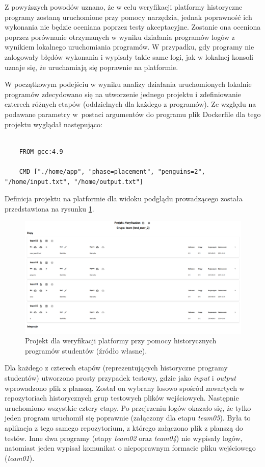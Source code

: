 Z powyższych powodów uznano, że w celu weryfikacji platformy historyczne programy zostaną uruchomione przy pomocy narzędzia, jednak poprawność ich wykonania nie będzie oceniana poprzez testy akceptacyjne.
Zostanie ona oceniona poprzez porównanie otrzymanych w wyniku działania programów logów z wynikiem lokalnego uruchomiania programów.
W przypadku, gdy programy nie zalogowały błędów wykonania i wypisały takie same logi, jak w lokalnej konsoli uznaje się, że uruchamiają się poprawnie na platformie.

W początkowym podejściu w wyniku analizy działania uruchomionych lokalnie programów zdecydowano się na utworzenie jednego projektu i zdefiniowanie czterech różnych etapów (oddzielnych dla każdego z programów).
Ze względu na podawane parametry w~postaci argumentów do programu plik Dockerfile dla tego projektu wyglądał następująco:

{\selectfont
\tiny
\begin{lstlisting}

    FROM gcc:4.9

    CMD ["./home/app", "phase=placement", "penguins=2", "/home/input.txt", "/home/output.txt"]

\end{lstlisting}
}

Definicja projektu na platformie dla widoku podglądu prowadzącego została przedstawiona na rysunku \ref{fig:veryfication_first_project}.

\begin{figure}[h]
    \centering
    \includegraphics[width = 12cm]{chapter06/veryfication_first_project.png}
    \caption{Projekt dla weryfikacji platformy przy pomocy historycznych programów studentów (źródło własne).}
    \label{fig:veryfication_first_project}
\end{figure}

Dla każdego z czterech etapów (reprezentujących historyczne programy studentów) utworzono prosty przypadek testowy, gdzie jako \textit{input} i \textit{output} wprowadzono plik z planszą.
Został on wybrany losowo spośród zawartych w repozytoriach historycznych grup testowych plików wejściowych.
Następnie uruchomiono wszystkie cztery etapy.
Po przejrzeniu logów okazało się, że tylko jeden program uruchomił się poprawnie (załączony dla etapu \textit{team05}).
Była to aplikacja z tego samego repozytorium, z którego załączono plik z planszą do testów.
Inne dwa programy (etapy \textit{team02} oraz \textit{team04}) nie wypisały logów, natomiast jeden wypisał komunikat o niepoprawnym formacie pliku wejściowego (\textit{team01}).

